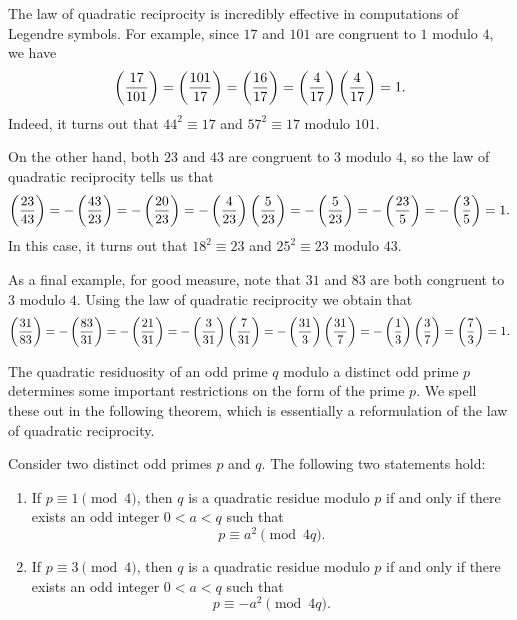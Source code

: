 \begin{example}
  The law of quadratic reciprocity is incredibly effective in computations of Legendre symbols. For example, since $17$ and $101$ are congruent to $1$ modulo $4$, we have
  \begin{equation*}
    \legendre{17}{101}=\legendre{101}{17}=\legendre{16}{17}=\legendre{4}{17}\legendre{4}{17}=1.
  \end{equation*}
  Indeed, it turns out that $44^2\equiv 17$ and $57^2\equiv17$ modulo $101$.

  On the other hand, both $23$ and $43$ are congruent to $3$ modulo $4$, so the law of quadratic reciprocity tells us that
  \begin{equation*}
    \legendre{23}{43}=-\legendre{43}{23}=-\legendre{20}{23}=-\legendre{4}{23}\legendre{5}{23}=-\legendre{5}{23}=-\legendre{23}{5}=-\legendre{3}{5}=1.
  \end{equation*}
  In this case, it turns out that $18^2\equiv 23$ and $25^2\equiv 23$ modulo $43$.
  
  As a final example, for good measure, note that $31$ and $83$ are both congruent to $3$ modulo $4$. Using the law of quadratic reciprocity we obtain that
  \begin{equation*}
    \legendre{31}{83}=-\legendre{83}{31}=-\legendre{21}{31}=-\legendre{3}{31}\legendre{7}{31}=-\legendre{31}{3}\legendre{31}{7}=-\legendre{1}{3}\legendre{3}{7}=\legendre{7}{3}=1.
  \end{equation*}
\end{example}

The quadratic residuosity of an odd prime $q$ modulo a distinct odd prime $p$ determines some important restrictions on the form of the prime $p$. We spell these out in the following theorem, which is essentially a reformulation of the law of quadratic reciprocity.
  
\begin{theorem}
  Consider two distinct odd primes $p$ and $q$. The following two statements hold:
  \begin{enumerate}
  \item \label{itemi:explicit-reciprocity}If $p\equiv 1\pmod{4}$, then $q$ is a quadratic residue modulo $p$ if and only if there exists an odd integer $0<a<q$ such that
    \begin{equation*}
      p\equiv a^2\pmod{4q}.
    \end{equation*}
  \item \label{itemii:explicit-reciprocity}If $p\equiv 3\pmod{4}$, then $q$ is a quadratic residue modulo $p$ if and only if there exists an odd integer $0<a<q$ such that
    \begin{equation*}
      p\equiv -a^2\pmod{4q}.
    \end{equation*}
  \end{enumerate}
\end{theorem}

